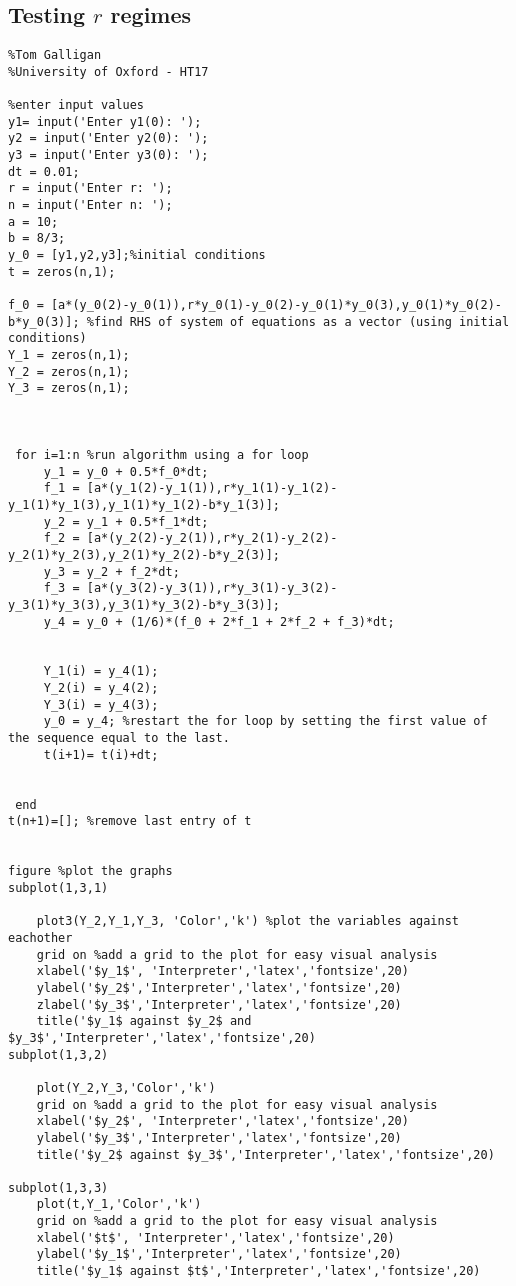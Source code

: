 \documentclass[a4paper,11pt]{article}
\begin{document}
\subsection{Testing $r$ regimes}
\begin{lstlisting}[style=matlab-editor]
%CO24: Chaos
%Tom Galligan
%University of Oxford - HT17

%enter input values
y1= input('Enter y1(0): ');
y2 = input('Enter y2(0): ');
y3 = input('Enter y3(0): ');
dt = 0.01;
r = input('Enter r: ');
n = input('Enter n: ');
a = 10;
b = 8/3;
y_0 = [y1,y2,y3];%initial conditions
t = zeros(n,1);

f_0 = [a*(y_0(2)-y_0(1)),r*y_0(1)-y_0(2)-y_0(1)*y_0(3),y_0(1)*y_0(2)-b*y_0(3)]; %find RHS of system of equations as a vector (using initial conditions)
Y_1 = zeros(n,1);
Y_2 = zeros(n,1);
Y_3 = zeros(n,1);



 for i=1:n %run algorithm using a for loop
     y_1 = y_0 + 0.5*f_0*dt;
     f_1 = [a*(y_1(2)-y_1(1)),r*y_1(1)-y_1(2)-y_1(1)*y_1(3),y_1(1)*y_1(2)-b*y_1(3)];
     y_2 = y_1 + 0.5*f_1*dt;
     f_2 = [a*(y_2(2)-y_2(1)),r*y_2(1)-y_2(2)-y_2(1)*y_2(3),y_2(1)*y_2(2)-b*y_2(3)];
     y_3 = y_2 + f_2*dt;
     f_3 = [a*(y_3(2)-y_3(1)),r*y_3(1)-y_3(2)-y_3(1)*y_3(3),y_3(1)*y_3(2)-b*y_3(3)];
     y_4 = y_0 + (1/6)*(f_0 + 2*f_1 + 2*f_2 + f_3)*dt;
     
     
     Y_1(i) = y_4(1);
     Y_2(i) = y_4(2);
     Y_3(i) = y_4(3);
     y_0 = y_4; %restart the for loop by setting the first value of the sequence equal to the last.
     t(i+1)= t(i)+dt;
     
   
 end
t(n+1)=[]; %remove last entry of t


figure %plot the graphs
subplot(1,3,1)
   
    plot3(Y_2,Y_1,Y_3, 'Color','k') %plot the variables against eachother
    grid on %add a grid to the plot for easy visual analysis
    xlabel('$y_1$', 'Interpreter','latex','fontsize',20)
    ylabel('$y_2$','Interpreter','latex','fontsize',20)
    zlabel('$y_3$','Interpreter','latex','fontsize',20)
    title('$y_1$ against $y_2$ and $y_3$','Interpreter','latex','fontsize',20)
subplot(1,3,2)    
    
    plot(Y_2,Y_3,'Color','k')
    grid on %add a grid to the plot for easy visual analysis
    xlabel('$y_2$', 'Interpreter','latex','fontsize',20)
    ylabel('$y_3$','Interpreter','latex','fontsize',20)
    title('$y_2$ against $y_3$','Interpreter','latex','fontsize',20)

subplot(1,3,3)     
    plot(t,Y_1,'Color','k')
    grid on %add a grid to the plot for easy visual analysis
    xlabel('$t$', 'Interpreter','latex','fontsize',20)
    ylabel('$y_1$','Interpreter','latex','fontsize',20)
    title('$y_1$ against $t$','Interpreter','latex','fontsize',20)

\end{lstlisting}
\end{document}
